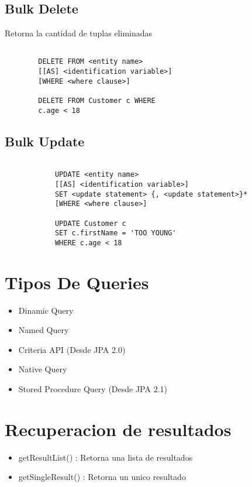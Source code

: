 \documentclass{article}
\begin{document}
\subsection*{Bulk Delete}
Retorna la cantidad de tuplas eliminadas

\begin{lstlisting}
        
        DELETE FROM <entity name> 
        [[AS] <identification variable>]
        [WHERE <where clause>]

        DELETE FROM Customer c WHERE 
        c.age < 18

    \end{lstlisting}

\subsection*{Bulk Update}
\begin{lstlisting}
            
            UPDATE <entity name> 
            [[AS] <identification variable>]
            SET <update statement> {, <update statement>}*
            [WHERE <where clause>]
    
            UPDATE Customer c 
            SET c.firstName = 'TOO YOUNG' 
            WHERE c.age < 18
    \end{lstlisting}

\section*{Tipos De Queries}
\begin{itemize}
	\item Dinamic Query
	\item Named Query
	\item Criteria API (Desde JPA 2.0)
	\item Native Query
	\item Stored Procedure Query (Desde JPA 2.1)
\end{itemize}
\section*{Recuperacion de resultados}
\begin{itemize}
	\item getResultList() : Retorna una lista de resultados
	\item getSingleResult() : Retorna un unico resultado
\end{itemize}
\end{document}
